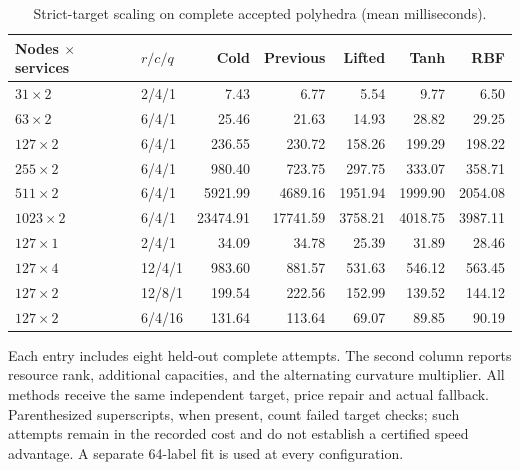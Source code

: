 \begin{table}[tbp]\centering\small
\caption{Strict-target scaling on complete accepted polyhedra (mean milliseconds).}\label{tab:r22-scaling}
\begin{tabular}{llrrrrr}
\toprule
Nodes $\times$ services & $r/c/q$ & Cold & Previous & Lifted & Tanh & RBF\\
\midrule
$31\times 2$ & 2/4/1 & 7.43 & 6.77 & 5.54 & 9.77 & 6.50\\
$63\times 2$ & 6/4/1 & 25.46 & 21.63 & 14.93 & 28.82 & 29.25\\
$127\times 2$ & 6/4/1 & 236.55 & 230.72 & 158.26 & 199.29 & 198.22\\
$255\times 2$ & 6/4/1 & 980.40 & 723.75 & 297.75 & 333.07 & 358.71\\
$511\times 2$ & 6/4/1 & 5921.99 & 4689.16 & 1951.94 & 1999.90 & 2054.08\\
$1023\times 2$ & 6/4/1 & 23474.91 & 17741.59 & 3758.21 & 4018.75 & 3987.11\\
$127\times 1$ & 2/4/1 & 34.09 & 34.78 & 25.39 & 31.89 & 28.46\\
$127\times 4$ & 12/4/1 & 983.60 & 881.57 & 531.63 & 546.12 & 563.45\\
$127\times 2$ & 12/8/1 & 199.54 & 222.56 & 152.99 & 139.52 & 144.12\\
$127\times 2$ & 6/4/16 & 131.64 & 113.64 & 69.07 & 89.85 & 90.19\\
\bottomrule
\end{tabular}
\par\smallskip\begin{minipage}{.98\textwidth}\small Each entry includes eight held-out complete attempts. The second column reports resource rank, additional capacities, and the alternating curvature multiplier. All methods receive the same independent target, price repair and actual fallback. Parenthesized superscripts, when present, count failed target checks; such attempts remain in the recorded cost and do not establish a certified speed advantage. A separate 64-label fit is used at every configuration.\end{minipage}
\end{table}
